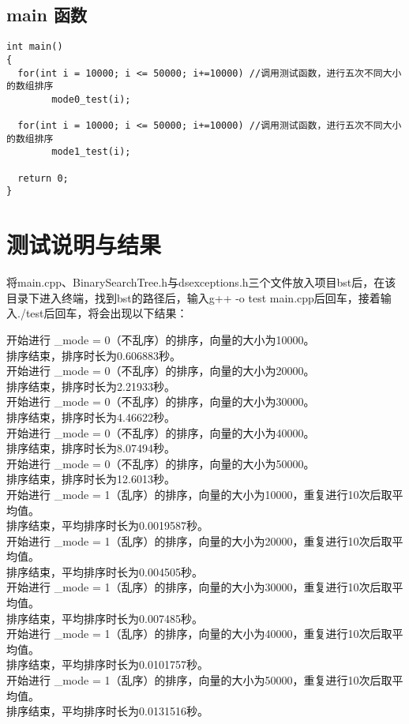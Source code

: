 \documentclass[UTF8]{ctexart}
\begin{document}
\subsection{main 函数}

\begin{lstlisting}[language={[ANSI]C++}]
int main()
{
  for(int i = 10000; i <= 50000; i+=10000) //调用测试函数，进行五次不同大小的数组排序
        mode0_test(i);
        
  for(int i = 10000; i <= 50000; i+=10000) //调用测试函数，进行五次不同大小的数组排序
        mode1_test(i);

  return 0;
}
\end{lstlisting}

\newpage

\section{测试说明与结果}

将main.cpp、BinarySearchTree.h与dsexceptions.h三个文件放入项目bst后，在该目录下进入终端，找到bst的路径后，输入g++ -o test main.cpp后回车，接着输入./test后回车，将会出现以下结果：

\begin{flushleft}
开始进行 \_mode = 0（不乱序）的排序，向量的大小为10000。\\
排序结束，排序时长为0.606883秒。\\
开始进行 \_mode = 0（不乱序）的排序，向量的大小为20000。\\
排序结束，排序时长为2.21933秒。\\
开始进行 \_mode = 0（不乱序）的排序，向量的大小为30000。\\
排序结束，排序时长为4.46622秒。\\
开始进行 \_mode = 0（不乱序）的排序，向量的大小为40000。\\
排序结束，排序时长为8.07494秒。\\
开始进行 \_mode = 0（不乱序）的排序，向量的大小为50000。\\
排序结束，排序时长为12.6013秒。\\
开始进行 \_mode = 1（乱序）的排序，向量的大小为10000，重复进行10次后取平均值。\\
排序结束，平均排序时长为0.0019587秒。\\
开始进行 \_mode = 1（乱序）的排序，向量的大小为20000，重复进行10次后取平均值。\\
排序结束，平均排序时长为0.004505秒。\\
开始进行 \_mode = 1（乱序）的排序，向量的大小为30000，重复进行10次后取平均值。\\
排序结束，平均排序时长为0.007485秒。\\
开始进行 \_mode = 1（乱序）的排序，向量的大小为40000，重复进行10次后取平均值。\\
排序结束，平均排序时长为0.0101757秒。\\
开始进行 \_mode = 1（乱序）的排序，向量的大小为50000，重复进行10次后取平均值。\\
排序结束，平均排序时长为0.0131516秒。\\
\end{flushleft}
\end{document}
